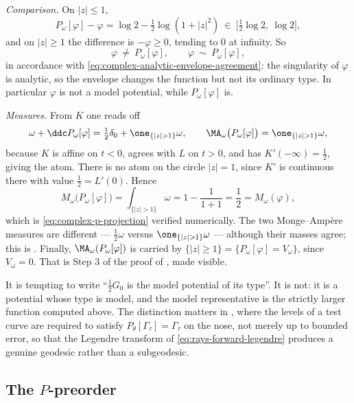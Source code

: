 \begin{example}
\emph{Comparison.}  On \(|z|\leq1\),
\[
 P_\omega[\varphi]-\varphi
 =\log2-\tfrac12\log(1+|z|^2)
 \ \in\ \bigl[\tfrac12\log2,\ \log2\bigr],
\]
and on \(|z|\geq1\) the difference is
\(-\varphi\geq0\), tending to \(0\) at infinity.  So
\[
 \varphi\ \neq\ P_\omega[\varphi],
 \qquad
 \varphi\ \sim\ P_\omega[\varphi],
\]
in accordance with \eqref{eq:complex-analytic-envelope-agreement}: the
singularity of \(\varphi\) is analytic, so the envelope changes the
function but not its ordinary type.  In particular \(\varphi\) is not a
model potential, while \(P_\omega[\varphi]\) is.

\emph{Measures.}  From \(K\) one reads off
\[
 \omega+\ddc P_\omega[\varphi]
 =\tfrac12\delta_0+\one_{\{|z|>1\}}\omega,
 \qquad
 \MA_\omega\bigl(P_\omega[\varphi]\bigr)
 =\one_{\{|z|>1\}}\omega ,
\]
because \(K\) is affine on \(t<0\), agrees with \(L\) on \(t>0\), and has
\(K'(-\infty)=\frac12\), giving the atom.  There is no atom on the circle
\(|z|=1\), since \(K'\) is continuous there with value
\(\frac12=L'(0)\).  Hence
\[
 M_\omega\bigl(P_\omega[\varphi]\bigr)
 =\int_{\{|z|>1\}}\omega
 =1-\frac{1}{1+1}=\frac12
 =M_\omega(\varphi),
\]
which is \eqref{eq:complex-p-projection} verified numerically.  The two
Monge--Amp\`ere measures are different --- \(\frac12\omega\) versus
\(\one_{\{|z|>1\}}\omega\) --- although their masses agree; this is
.  Finally,
\(\MA_\omega(P_\omega[\varphi])\) is carried by
\(\{|z|\geq1\}=\{P_\omega[\varphi]=V_\omega\}\), since \(V_\omega=0\).
That is Step 3 of the proof of , made
visible.
\end{example}

\begin{remark}
\label{rem:ch51-model-vs-type}
It is tempting to write ``\(\frac12G_0\) is the model potential of its
type''.  It is not: it is a potential whose type is model, and the model
representative is the strictly larger function computed above.  The
distinction matters in , where the levels of
a test curve are required to satisfy
\(P_\theta[\Gamma_\tau]=\Gamma_\tau\) on the nose, not merely up to
bounded error, so that the Legendre transform of
\eqref{eq:rays-forward-legendre} produces a genuine geodesic rather than
a subgeodesic.
\end{remark}

\subsection{The \texorpdfstring{\(P\)}{P}-preorder}
\label{sec:ch51-p-preorder}

